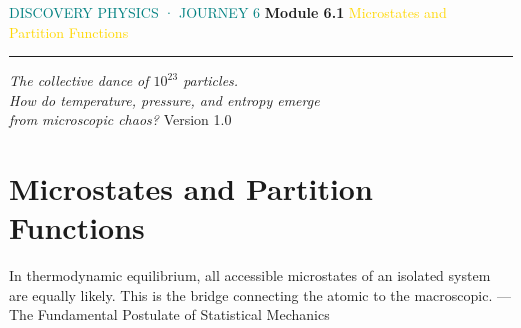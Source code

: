 \documentclass[12pt, a4paper, twoside]{book}
\begin{document}
\begin{titlepage}
\pagecolor{deep}\color{white}\centering\vspace*{1.8cm}


\vspace{0.8cm}
{\fontsize{11}{14}\selectfont\textcolor{teal}{\MakeUppercase{Discovery Physics · Journey 6}}}
\vspace{0.3cm}
{\fontsize{34}{40}\selectfont\bfseries Module 6.1}
\vspace{0.3cm}
{\fontsize{20}{26}\selectfont\textcolor{gold}{%
Microstates and\\
Partition Functions}}
\vspace{0.5cm}
\textcolor{white!60}{\rule{8cm}{0.4pt}}
\vspace{0.4cm}
{\fontsize{12}{18}\selectfont\textcolor{white!80}{\itshape
The collective dance of $10^{23}$ particles.\\[4pt]
How do temperature, pressure, and entropy emerge\\
from microscopic chaos?}}
\vfill\textcolor{white!30}{\small Version 1.0}
\end{titlepage}
\nopagecolor
\tableofcontents

\chapter{Microstates and Partition Functions}

\begin{epigraph}
{In thermodynamic equilibrium, all accessible microstates of an isolated system are equally likely. This is the bridge connecting the atomic to the macroscopic.}
{--- The Fundamental Postulate of Statistical Mechanics}
\end{epigraph}
\end{document}
